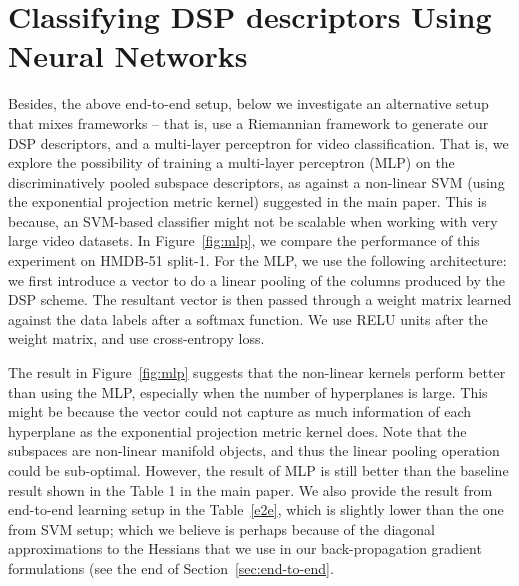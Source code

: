 \documentclass[runningheads]{llncs}
\begin{document}
 \section{Classifying DSP descriptors Using Neural Networks}
Besides, the above end-to-end setup, below we investigate an alternative setup that mixes frameworks -- that is, use a Riemannian framework to generate our DSP descriptors, and a multi-layer perceptron for video classification. That is, we explore the possibility of training a multi-layer perceptron (MLP) on the discriminatively pooled subspace descriptors, as against a non-linear SVM (using the exponential projection metric kernel) suggested in the main paper. This is because, an SVM-based classifier might not be scalable when working with very large video datasets. In Figure~\ref{fig:mlp}, we compare the performance of this experiment on HMDB-51 split-1. For the MLP, we use the following architecture: we first introduce a  vector to do a linear pooling of the  columns produced by the DSP scheme. The resultant  vector is then passed through a  weight matrix learned against the data labels after a softmax function. We use RELU units after the weight matrix, and use cross-entropy loss.

\begin{figure}
\begin{floatrow}
\end{floatrow}
\end{figure}

The result in Figure~\ref{fig:mlp} suggests that the non-linear kernels perform better than using the MLP, especially when the number of hyperplanes  is large. This might be because the  vector could not capture as much information of each hyperplane as the exponential projection metric kernel does. Note that the subspaces are non-linear manifold objects, and thus the linear pooling operation could be sub-optimal. However, the result of MLP is still better than the baseline result shown in the Table 1 in the main paper. We also provide the result from end-to-end learning setup in the Table~\ref{e2e}, which is slightly lower than the one from SVM setup; which we believe is perhaps because of the diagonal approximations to the Hessians that we use in our back-propagation gradient formulations (see the end of Section~\ref{sec:end-to-end}.
\end{document}
